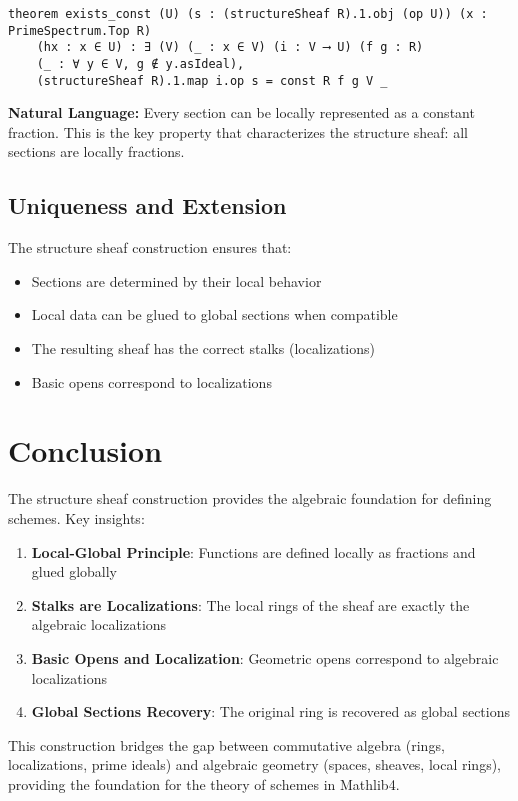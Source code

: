 \documentclass{article}
\theoremstyle{definition}
\begin{document}
\begin{lstlisting}
theorem exists_const (U) (s : (structureSheaf R).1.obj (op U)) (x : PrimeSpectrum.Top R)
    (hx : x ∈ U) : ∃ (V) (_ : x ∈ V) (i : V ⟶ U) (f g : R)
    (_ : ∀ y ∈ V, g ∉ y.asIdeal),
    (structureSheaf R).1.map i.op s = const R f g V _
\end{lstlisting}

\textbf{Natural Language:} Every section can be locally represented as a constant fraction. This is the key property that characterizes the structure sheaf: all sections are locally fractions.

\subsection{Uniqueness and Extension}

The structure sheaf construction ensures that:
\begin{itemize}
\item Sections are determined by their local behavior
\item Local data can be glued to global sections when compatible
\item The resulting sheaf has the correct stalks (localizations)
\item Basic opens correspond to localizations
\end{itemize}

\section{Conclusion}

The structure sheaf construction provides the algebraic foundation for defining schemes. Key insights:

\begin{enumerate}
\item \textbf{Local-Global Principle}: Functions are defined locally as fractions and glued globally
\item \textbf{Stalks are Localizations}: The local rings of the sheaf are exactly the algebraic localizations
\item \textbf{Basic Opens and Localization}: Geometric opens correspond to algebraic localizations
\item \textbf{Global Sections Recovery}: The original ring is recovered as global sections
\end{enumerate}

This construction bridges the gap between commutative algebra (rings, localizations, prime ideals) and algebraic geometry (spaces, sheaves, local rings), providing the foundation for the theory of schemes in Mathlib4.
\end{document}
